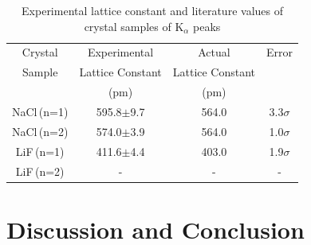 \documentclass[aps,prl,twocolumn,superscriptaddress,nofootinbib]{revtex4-1}
\begin{document}
 \begin{table}[h!] 
\caption{Experimental lattice constant and literature values of crystal samples of K$_\alpha$ peaks}
\label{t2}   %
 \begin{center}   %
    \begin{tabular}{|c|c|c|c|} \hline   %
Crystal  & Experimental & Actual & Error \\
 Sample   & Lattice Constant  & Lattice Constant &  \\
       & (pm)  & (pm) &   \\ \hline \hline \hline
NaCl\,(n=1) & 595.8$\pm$9.7 & 564.0 & 3.3$\sigma$ \\ \hline
NaCl\,(n=2) & 574.0$\pm$3.9 & 564.0 & 1.0$\sigma$ \\ \hline
LiF\,(n=1) & 411.6$\pm$4.4 & 403.0 & 1.9$\sigma$ \\ \hline
LiF\,(n=2) & - & - & - \\ \hline
     \end{tabular}
  \end{center}
\end{table}
\vfill\eject

\section{Discussion and Conclusion}
\end{document}

